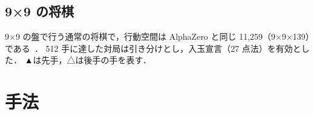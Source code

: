 \documentclass[submit]{ipsj}
\begin{document}
\subsection{9×9 の将棋}
9×9 の盤で行う通常の将棋で，行動空間は AlphaZero と同じ 11,259（9×9×139）である~\cite{alphazero}．
512 手に達した対局は引き分けとし，入玉宣言（27 点法）を有効とした．
▲は先手，△は後手の手を表す．

\section{手法}
\end{document}
